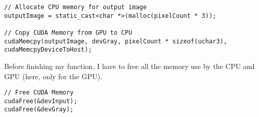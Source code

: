 \documentclass[11pt]{article} %
\begin{document}
\begin{lstlisting}[style=CStyle]
// Allocate CPU memory for output image
outputImage = static_cast<char *>(malloc(pixelCount * 3));

// Copy CUDA Memory from GPU to CPU
cudaMemcpy(outputImage, devGray, pixelCount * sizeof(uchar3), cudaMemcpyDeviceToHost);
\end{lstlisting}

Before finishing my function, I have to free all the memory use by the CPU and GPU (here, only for the GPU).

\begin{lstlisting}[style=CStyle]
// Free CUDA Memory
cudaFree(&devInput);
cudaFree(&devGray);
\end{lstlisting}

%
%
%
\end{document}
